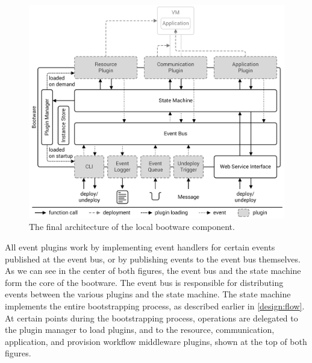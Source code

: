 \begin{figure}[!htbp]
	\centering
	\includegraphics[resolution=600]{design/assets/final_architecture_local}
	\caption{The final architecture of the local bootware component.}
	\label{image:finalarchlocal}
\end{figure}

All event plugins work by implementing event handlers for certain events published at the event bus, or by publishing events to the event bus themselves.
As we can see in the center of both figures, the event bus and the state machine form the core of the bootware.
The event bus is responsible for distributing events between the various plugins and the state machine.
The state machine implements the entire bootstrapping process, as described earlier in \autoref{design:flow}.
At certain points during the bootstrapping process, operations are delegated to the plugin manager to load plugins, and to the resource, communication, application, and provision workflow middleware plugins, shown at the top of both figures.

